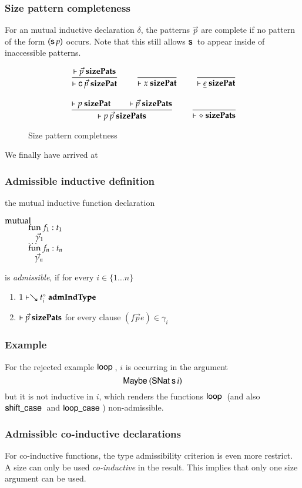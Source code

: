 \subsubsection{Size pattern completeness}
For an mutual inductive declaration $\delta$, the patterns $\vec{p}$ are complete 
if no pattern of the form $(\mathsf{s}\, p)$ occurs. 
Note that this still allows $\mathsf{s}\,$ to appear inside of inaccessible patterns.

\begin{figure}
\begin{gather*}
\ \dfrac{\vdash\vec{p}\mbox{ \textbf{sizePats}}}{\vdash\mathsf{c} \: \vec{p}\mbox{ \textbf{sizePat}}}
\qquad
\ \dfrac{}{\vdash x\mbox{ \textbf{sizePat}}}
\qquad
\ \dfrac{}{\vdash\underline{e}\mbox{ \textbf{sizePat}}}
\\[2ex]
\ \dfrac{\vdash p\mbox{ \textbf{sizePat}} \qquad \vdash\vec{p}\mbox{ \textbf{sizePats}}}{\vdash p \: \vec{p}\mbox{ \textbf{sizePats}}}
\qquad
\ \dfrac{}{\vdash\diamond\mbox{ \textbf{sizePats}}}
\end{gather*}
\caption{Size pattern completness}
\end{figure}

We finally have arrived at
\subsubsection{Admissible inductive definition}
the mutual inductive function declaration
\begin{bsp}
$\mathrm{mutual}\:$\\
$\spcx \fun f_1 : t_1 $\\
$\spcx \spc \vec{\gamma}_1$\\
$\spcx \ldots$\\
$\spcx \fun f_n : t_n $\\
$\spcx \spc \vec{\gamma}_n$
\end{bsp}
is \emph{admissible}, if  for every $i \in \{1 \ldots n \}  $
\begin{enumerate}
\item
$1\vdash\searrow t_i^{\diamond}\mbox{ \textbf{admIndType}}$
\item
$\vdash\vec{p}\mbox{ \textbf{sizePats}}$ for every clause $(f \vec{p} e) \in \gamma_i$
\end{enumerate}

\subsubsection{Example}
For the rejected example $\mathsf{loop}\:$, $i$ is occurring in the argument \[\mathsf{Maybe}\: (\mathsf{SNat}\: \mathsf{s}\, i)\] but it is not inductive in $i$, which renders the functions $\mathsf{loop}\:$ (and also $ \mathsf{shift\_case}\:$ and $\mathsf{loop\_case}\:$) non-admissible.


\subsubsection{Admissible co-inductive declarations}
For co-inductive functions, the type admissibility criterion is even more restrict.
A size can only be used \emph{co-inductive} in the result.
This implies that only one size argument can be used.

